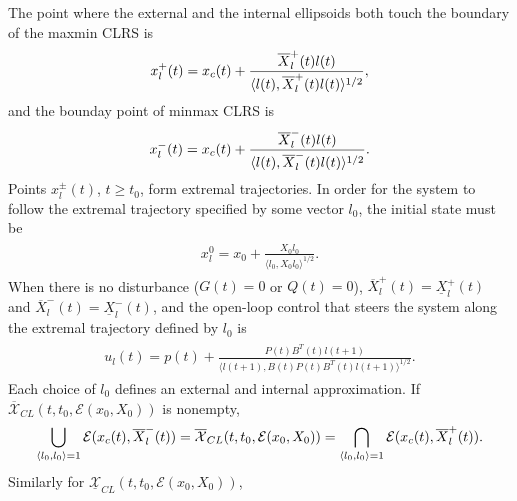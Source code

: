 \documentclass[letterpaper,10pt,english]{sphinxmanual}
\begin{document}
The point where the external and the internal ellipsoids both touch the
boundary of the maxmin CLRS is
\begin{gather}
\begin{split}x_l^+(t) = x_c(t) + \frac{\overline{X}^+_l(t)l(t)}{\langle l(t),
\overline{X}^+_l(t)l(t)\rangle^{1/2}} ,\end{split}\notag
\end{gather}
and the bounday point of minmax CLRS is
\begin{gather}
\begin{split}x_l^-(t) = x_c(t) + \frac{\overline{X}^-_l(t)l(t)}{\langle l(t),
\overline{X}^-_l(t)l(t)\rangle^{1/2}} .\end{split}\notag
\end{gather}
Points \(x^{\pm}_l(t)\), \(t\geqslant t_0\), form extremal
trajectories. In order for the system to follow the extremal trajectory
specified by some vector \(l_0\), the initial state must be
\label{chap_reach:equation-dx01}\begin{gather}
\begin{split}x_l^0 = x_0 + \frac{X_0l_0}{\langle l_0, X_0l_0\rangle^{1/2}}.\end{split}\label{chap_reach-dx01}
\end{gather}
When there is no disturbance (\(G(t)=0\) or \(Q(t)=0\)),
\(\overline{X}^+_l(t)=\underline{X}^+_l(t)\) and
\(\overline{X}^-_l(t)=\underline{X}^-_l(t)\), and the open-loop
control that steers the system along the extremal trajectory defined by
\(l_0\) is
\label{chap_reach:equation-udt}\begin{gather}
\begin{split}u_l(t) = p(t) + \frac{P(t)B^T(t)l(t+1)}{\langle l(t+1),
B(t)P(t)B^T(t)l(t+1)\rangle^{1/2}}.\end{split}\label{chap_reach-udt}
\end{gather}
Each choice of \(l_0\) defines an external and internal
approximation. If \(\overline{{\mathcal X}}_{CL}(t,t_0,{\mathcal E}(x_0,X_0))\) is
nonempty,
\begin{gather}
\begin{split}\bigcup_{\langle l_0,l_0\rangle=1}{\mathcal E}(x_c(t),\overline{X}^-_l(t)) =
\overline{{\mathcal X}}_{CL}(t,t_0,{\mathcal E}(x_0,X_0)) =
\bigcap_{\langle l_0,l_0\rangle=1}{\mathcal E}(x_c(t),\overline{X}^+_l(t)).\end{split}\notag
\end{gather}
Similarly for
\(\underline{{\mathcal X}}_{CL}(t,t_0,{\mathcal E}(x_0,X_0))\),
\end{document}
